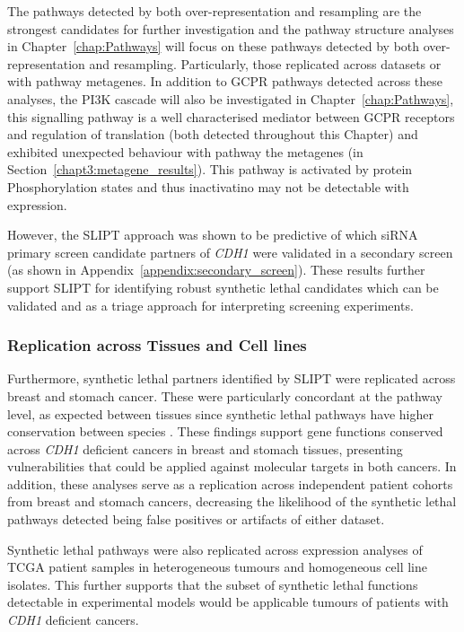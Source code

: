 The pathways detected by both over-represent\-ation and resampling are the strongest candidates for further investigation and the pathway structure analyses in Chapter~\ref{chap:Pathways} will focus on these pathways detected by both over-representation and resampling. Particularly, those replicated across datasets or with pathway metagenes. In addition to GCPR pathways detected across these analyses, the PI3K cascade will also be investigated in Chapter~\ref{chap:Pathways}, this signalling pathway is a well characterised mediator between GCPR receptors and regulation of translation \citep{Gao2015} (both detected throughout this Chapter) and exhibited unexpected behaviour with pathway the metagenes (in Section~\ref{chapt3:metagene_results}). This pathway is activated by protein Phosphorylation states and thus inactivatino may not be detectable with expression.

However, the \gls{SLIPT} approach was shown to be predictive of which siRNA primary screen candidate partners of \textit{CDH1} were validated in a secondary screen (as shown in Appendix~\ref{appendix:secondary_screen}). These results further support \gls{SLIPT} for identifying robust synthetic lethal candidates which can be validated and as a triage approach for interpreting screening experiments.

\subsubsection{Replication across Tissues and Cell lines}

Furthermore, synthetic lethal partners identified by \gls{SLIPT} were replicated across breast and stomach cancer. These were particularly concordant at the pathway level, as expected between tissues since synthetic lethal pathways have higher conservation between species \citep{Dixon2008}. These findings support gene functions conserved across \textit{CDH1} deficient cancers in breast and stomach tissues, presenting vulnerabilities that could be applied against molecular targets in both cancers. In addition, these analyses serve as a replication across independent patient cohorts from breast and stomach cancers, decreasing the likelihood of the synthetic lethal pathways detected being false positives or artifacts of either dataset.

Synthetic lethal pathways were also replicated across expression analyses of TCGA patient samples in heterogeneous tumours and homogeneous cell line isolates. This further supports that the subset of synthetic lethal functions detectable in experimental models \citep{Chen2014, Telford2015} would be applicable tumours of patients with \textit{CDH1} deficient cancers.

